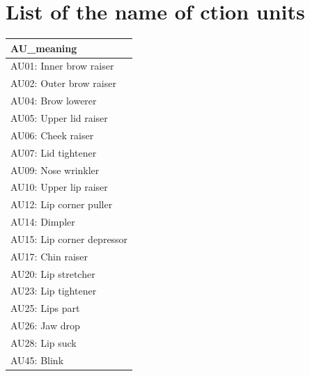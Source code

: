 \documentclass{monashthesis}
\begin{document}
\hypertarget{list-of-the-name-of-ction-units}{%
\section{List of the name of ction units}\label{list-of-the-name-of-ction-units}}

\begin{tabular}{l}
\hline
AU\_meaning\\
\hline
AU01: Inner brow raiser\\
\hline
AU02: Outer brow raiser\\
\hline
AU04: Brow lowerer\\
\hline
AU05: Upper lid raiser\\
\hline
AU06: Cheek raiser\\
\hline
AU07: Lid tightener\\
\hline
AU09: Nose wrinkler\\
\hline
AU10: Upper lip raiser\\
\hline
AU12: Lip corner puller\\
\hline
AU14: Dimpler\\
\hline
AU15: Lip corner depressor\\
\hline
AU17: Chin raiser\\
\hline
AU20: Lip stretcher\\
\hline
AU23: Lip tightener\\
\hline
AU25: Lips part\\
\hline
AU26: Jaw drop\\
\hline
AU28: Lip suck\\
\hline
AU45: Blink\\
\hline
\end{tabular}

\printbibliography[heading=bibintoc]
\end{document}
